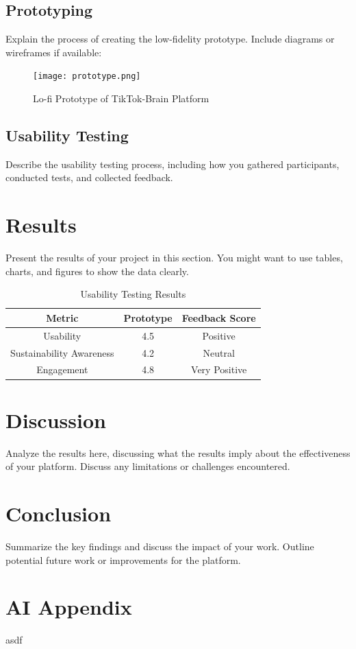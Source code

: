 \documentclass{article}
\begin{document}
\subsection{Prototyping}
Explain the process of creating the low-fidelity prototype. Include diagrams or wireframes if available:
\begin{figure}[h!]
    \centering
    \texttt{[image: prototype.png]} %
    \caption{Lo-fi Prototype of TikTok-Brain Platform}
    \label{fig:prototype}
\end{figure}

\subsection{Usability Testing}
Describe the usability testing process, including how you gathered participants, conducted tests, and collected feedback.

\section{Results}
Present the results of your project in this section. You might want to use tables, charts, and figures to show the data clearly.

\begin{table}[h!]
    \centering
    \begin{tabular}{|c|c|c|}
        \hline
        Metric & Prototype & Feedback Score \\
        \hline
        Usability & 4.5 & Positive \\
        Sustainability Awareness & 4.2 & Neutral \\
        Engagement & 4.8 & Very Positive \\
        \hline
    \end{tabular}
    \caption{Usability Testing Results}
    \label{tab:results}
\end{table}

\section{Discussion}
Analyze the results here, discussing what the results imply about the effectiveness of your platform. Discuss any limitations or challenges encountered.

\section{Conclusion}
Summarize the key findings and discuss the impact of your work. Outline potential future work or improvements for the platform.

\newpage


\newpage

\renewcommand{\thesection}{\Alph{section}}

\appendix

\section{AI Appendix}
asdf
\end{document}
